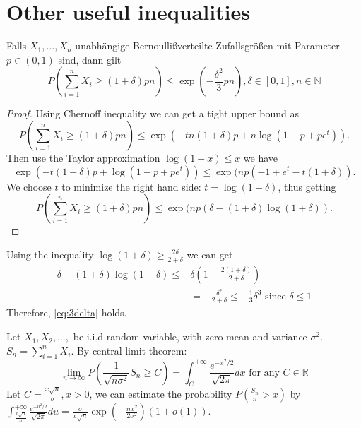 \documentclass{article}
\theoremstyle{definition}
\begin{document}
\section{Other useful inequalities}
Falls $X_1, \dots, X_n$ unabhängige Bernoullißverteilte Zufallsgrößen mit
Parameter $p \in (0,1) $ sind, dann gilt
\begin{equation}\label{eq:3delta}
P(\sum_{i=1}^n X_i \geq (1+ \delta) pn ) \leq \exp(-\frac{\delta^2}{3} pn),
\delta \in [0,1], n \in \mathbb{N}
\end{equation}
\begin{proof}
Using Chernoff inequality we can get a tight upper bound
as
$$
P(\sum_{i=1}^n X_i \geq (1+ \delta) pn )  \leq \exp(-tn(1+\delta) p + n\log(1-p+pe^t)).
$$
Then use the Taylor approximation $\log(1+x) \leq x$ we have
$$
 \exp(-t(1+\delta) p + \log(1-p+pe^t)) \leq \exp(np(-1+e^t - t(1+\delta)).
$$
We choose $t$ to minimize the right hand side: $t=\log(1+\delta)$, thus getting
$$
P(\sum_{i=1}^n X_i \geq (1+ \delta) pn )  \leq \exp(np (\delta - (1+\delta)\log(1+\delta)).
$$
\end{proof}
Using the inequality $\log(1+\delta) \geq \frac{2\delta}{2+\delta} $ we
can get
\begin{align*}
\delta - (1+\delta)\log(1+\delta) \leq & \delta (1-\frac{2(1+\delta)}{2+\delta}) \\
& = -\frac{\delta^2}{2+\delta} \leq -\frac{1}{3} \delta^3 \textrm{ since } \delta \leq 1
\end{align*}
Therefore, \eqref{eq:3delta} holds.

Let $X_1, X_2, \dots, $ be i.i.d random variable, with zero mean and variance $\sigma^2$.
$S_n = \sum_{i=1}^n X_i$.
By central limit theorem:
$$
\lim_{n\to \infty} P(\frac{1}{\sqrt{n\sigma^2}} S_n \geq C) =
\int_{C}^{+\infty} \frac{e^{-x^2/2}}{\sqrt{2\pi}} dx
\textrm{ for any } C \in \mathbb{R}
$$
Let $C=\frac{x\sqrt{n}}{\sigma}, x>0$, we can estimate the probability
$P(\frac{S_n}{n} > x)$ by $\int_{\frac{x\sqrt{n}}{\sigma}}^{+\infty}  \frac{e^{-u^2/2}}{\sqrt{2\pi}}du
= \frac{\sigma}{x\sqrt{n}} \exp(-\frac{nx^2}{2\sigma^2})(1+o(1))$.
\end{document}
